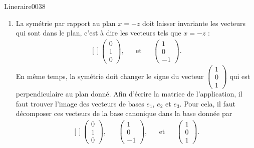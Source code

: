 \begin{corrige}{Lineraire0038}

	\begin{enumerate}

		\item
			


	La symétrie par rapport au plan $x=-z$ doit laisser invariante les vecteurs qui sont dans le plan, c'est à dire les vecteurs tels que $x=-z$ :
	\begin{equation}
		\begin{aligned}[]
			\begin{pmatrix}
				0	\\ 
				1	\\ 
				0	
			\end{pmatrix},&&\text{et}&&\begin{pmatrix}
				1	\\ 
				0	\\ 
				-1	
			\end{pmatrix}.
		\end{aligned}
	\end{equation}
	En même temps, la symétrie doit changer le signe du vecteur $\begin{pmatrix}
		1	\\ 
		0	\\ 
		1	
	\end{pmatrix}$ qui est perpendiculaire au plan donné. Afin d'écrire la matrice de l'application, il faut trouver l'image des vecteurs de bases $e_1$, $e_2$ et $e_3$. Pour cela, il faut décomposer ces vecteurs de la base canonique dans la base donnée par
	\begin{equation}
		\begin{aligned}[]
			\begin{pmatrix}
				0	\\ 
				1	\\ 
				0	
			\end{pmatrix},&&\begin{pmatrix}
				1	\\ 
				0	\\ 
				-1	
			\end{pmatrix},&&\text{et}&&\begin{pmatrix}
				1	\\ 
				0	\\ 
				1	
			\end{pmatrix}.

\end{aligned}
\end{equation}
\end{enumerate}
\end{corrige}
